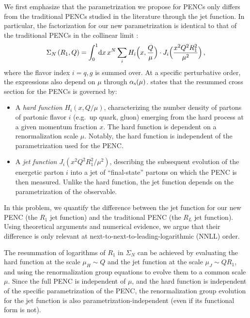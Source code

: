 We first emphasize that the parametrization we propose for PENCs only differs from the traditional PENCs studied in the literature through the jet function.
%
In particular, the factorization for our new parametrization is identical to that of the traditional PENCs in the collinear limit \cite{Dixon:2019uzg, Chen:2020vvp}:
\begin{align} \label{eq:fact}
    \Sigma_N
    \left(
    R_1, Q
    \right)
    =
    \int_0^1\!
    \dd x\,
    x^N
    \sum_i H_i
    \Bigl(x,\frac{Q}{\mu}\Bigr) \cdot
    J_i
    \Bigl( \frac{x^2 Q^2R_1^2}{\mu^2} \Bigr)
    \,,
\end{align}
where the flavor index \(i = q,g\)  is summed over.
%
At a specific perturbative order, the expressions also depend on $\mu$ through $\alphas(\mu)$.
%
 states that the resummed cross section for the PENCs %
is governed by:
\begin{itemize}
    \item
    A \textit{hard function} \(H_i(x, Q/\mu)\), characterizing the number density of partons of partonic flavor \(i\) (e.g.\ up quark, gluon) emerging from the hard process at a given momentum fraction \(x\).
    The hard function is dependent on a renormalization scale \(\mu\).
    Notably, the hard function is independent of the parametrization used for the PENC.

    \item
    A \textit{jet function} \(J_i( x^2 Q^2R_1^2/\mu^2 )\), describing the subsequent evolution of the energetic parton \(i\)
    into a jet of ``final-state'' partons on which the PENC is then measured.
    Unlike the hard function, the jet function depends on the parametrization of the observable.
\end{itemize}
%
In this problem, we quantify the difference between the jet function for our new PENC (the \(R_1\) jet function) and the traditional PENC (the \(R_L\) jet function). Using theoretical arguments and numerical evidence, we argue that their difference is only relevant at next-to-next-to-leading-logarithmic (NNLL) order.

The resummation of logarithms of $R_1$ in $\Sigma_N$ can be achieved by evaluating the hard function at the scale $\mu_H \sim Q$ and the jet function at the scale $\mu_J \sim Q R_1$, and using the renormalization group equations to evolve them to a common scale $\mu$.
%
Since the full PENC is independent of \(\mu\), and the hard function is independent of the specific parametrization of the PENC, the renormalization group evolution for the jet function is also parametrization-independent (even if its functional form is not).

